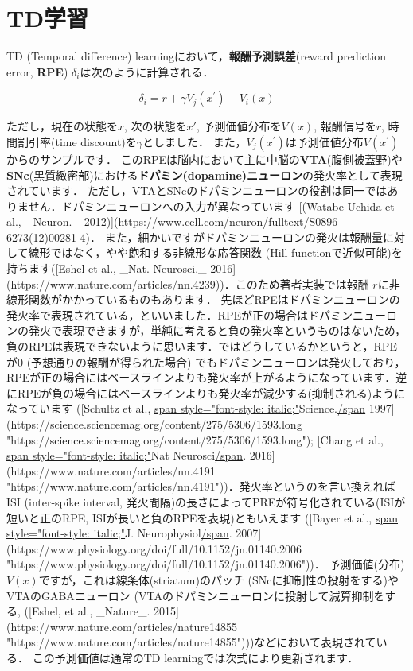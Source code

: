 \section{TD学習}
TD (Temporal difference) learningにおいて，\textbf{報酬予測誤差}(reward prediction error, \textbf{RPE}) $\delta_{i}$は次のように計算される． 
 
\begin{equation}
\delta_{i}=r+\gamma V_{j}\left(x^{\prime}\right)-V_{i}(x) 
\end{equation}
 
ただし，現在の状態を$x$, 次の状態を$x'$, 予測価値分布を$V(x)$, 報酬信号を$r$, 時間割引率(time discount)を$\gamma$としました．
また，$V_{j}\left(x^{\prime}\right)$は予測価値分布$V\left(x^{\prime}\right)$からのサンプルです． このRPEは脳内において主に中脳の\textbf{VTA}(腹側被蓋野)や\textbf{SNc}(黒質緻密部)における\textbf{ドパミン(dopamine)ニューロン}の発火率として表現されています．
ただし，VTAとSNcのドパミンニューロンの役割は同一ではありません．ドパミンニューロンへの入力が異なっています [(Watabe-Uchida et al., _Neuron._ 2012)](https://www.cell.com/neuron/fulltext/S0896-6273(12)00281-4)． また，細かいですがドパミンニューロンの発火は報酬量に対して線形ではなく，やや飽和する非線形な応答関数 (Hill functionで近似可能)を持ちます([Eshel et al., _Nat. Neurosci._ 2016](https://www.nature.com/articles/nn.4239))．このため著者実装では報酬 $r$に非線形関数がかかっているものもあります．
先ほどRPEはドパミンニューロンの発火率で表現されている，といいました．RPEが正の場合はドパミンニューロンの発火で表現できますが，単純に考えると負の発火率というものはないため，負のRPEは表現できないように思います．ではどうしているかというと，RPEが0 (予想通りの報酬が得られた場合) でもドパミンニューロンは発火しており，RPEが正の場合にはベースラインよりも発火率が上がるようになっています．逆にRPEが負の場合にはベースラインよりも発火率が減少する(抑制される)ようになっています
    ([Schultz et al., \url{span style="font-style: italic;"}Science.\url{/span} 1997](https://science.sciencemag.org/content/275/5306/1593.long "https://science.sciencemag.org/content/275/5306/1593.long"); [Chang et al., \url{span style="font-style: italic;"}Nat Neurosci\url{/span}. 2016](https://www.nature.com/articles/nn.4191 "https://www.nature.com/articles/nn.4191"))．発火率というのを言い換えればISI (inter-spike interval, 発火間隔)の長さによってPREが符号化されている(ISIが短いと正のRPE, ISIが長いと負のRPEを表現)ともいえます ([Bayer et al., \url{span style="font-style: italic;"}J.
    Neurophysiol\url{/span}. 2007](https://www.physiology.org/doi/full/10.1152/jn.01140.2006 "https://www.physiology.org/doi/full/10.1152/jn.01140.2006"))．
予測価値(分布) $V(x)$ですが，これは線条体(striatum)のパッチ (SNcに抑制性の投射をする)やVTAのGABAニューロン (VTAのドパミンニューロンに投射して減算抑制をする, ([Eshel, et al., _Nature_. 2015](https://www.nature.com/articles/nature14855 "https://www.nature.com/articles/nature14855")))などにおいて表現されている． この予測価値は通常のTD learningでは次式により更新されます． 
 
